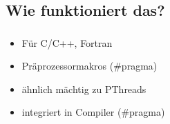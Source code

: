 \subsection{Wie funktioniert das?}
\begin{frame}
	\frametitle{\secname}
	\framesubtitle{\subsecname}
	
	\begin{itemize}
		\item Für C/C++, Fortran
		\item Präprozessormakros (\#pragma)
			\note[item]{}
		\item ähnlich mächtig zu PThreads
			\note[item]{}
		\item integriert in Compiler (\#pragma)
	\end{itemize}
\end{frame}